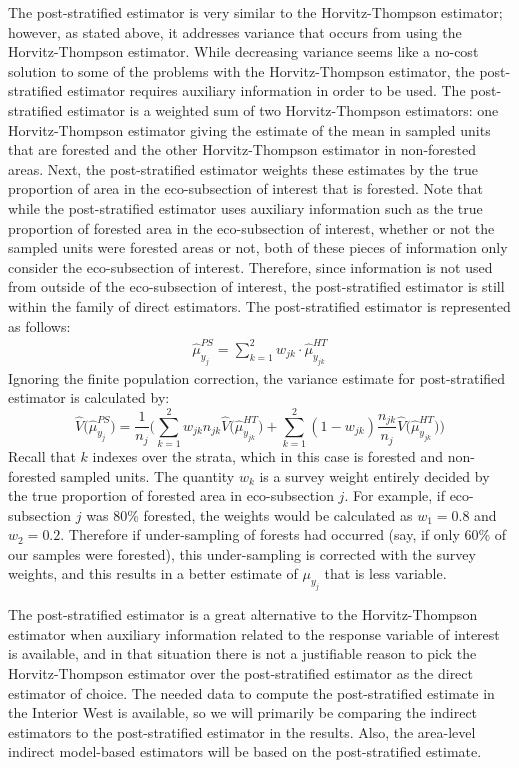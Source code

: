 \documentclass[12pt,twoside]{reedthesis}
\begin{document}
The post-stratified estimator is very similar to the Horvitz-Thompson estimator; however, as stated above, it addresses variance that occurs from using the Horvitz-Thompson estimator. While decreasing variance seems like a no-cost solution to some of the problems with the Horvitz-Thompson estimator, the post-stratified estimator requires auxiliary information in order to be used. The post-stratified estimator is a weighted sum of two Horvitz-Thompson estimators: one Horvitz-Thompson estimator giving the estimate of the mean in sampled units that are forested and the other Horvitz-Thompson estimator in non-forested areas. Next, the post-stratified estimator weights these estimates by the true proportion of area in the eco-subsection of interest that is forested. Note that while the post-stratified estimator uses auxiliary information such as the true proportion of forested area in the eco-subsection of interest, whether or not the sampled units were forested areas or not, both of these pieces of information only consider the eco-subsection of interest. Therefore, since information is not used from outside of the eco-subsection of interest, the post-stratified estimator is still within the family of direct estimators. The post-stratified estimator is represented as follows:
\begin{align}
\hat\mu_{y_j}^{PS} = \sum_{k=1}^{2} w_{jk} \cdot \hat\mu_{y_{jk}}^{HT}
\end{align}
Ignoring the finite population correction, the variance estimate for post-stratified estimator is calculated by:
\[
\hat V\Big(\hat \mu_{y_j}^{PS}\Big) = 
\frac{1}{n_j} \Bigg( \sum_{k=1}^{2} w_{jk} n_{jk} \hat V\Big(\hat\mu_{y_{jk}}^{HT}\Big) + 
\sum_{k=1}^{2} (1 - w_{jk}) \frac{n_{jk}}{n_j} \hat V\Big(\hat\mu_{y_{jk}}^{HT}\Big) \Bigg)
\]
Recall that \(k\) indexes over the strata, which in this case is forested and non-forested sampled units. The quantity \(w_k\) is a survey weight entirely decided by the true proportion of forested area in eco-subsection \(j\). For example, if eco-subsection \(j\) was 80\% forested, the weights would be calculated as \(w_1 = 0.8\) and \(w_2 = 0.2\). Therefore if under-sampling of forests had occurred (say, if only 60\% of our samples were forested), this under-sampling is corrected with the survey weights, and this results in a better estimate of \(\mu_{y_j}\) that is less variable.

The post-stratified estimator is a great alternative to the Horvitz-Thompson estimator when auxiliary information related to the response variable of interest is available, and in that situation there is not a justifiable reason to pick the Horvitz-Thompson estimator over the post-stratified estimator as the direct estimator of choice. The needed data to compute the post-stratified estimate in the Interior West is available, so we will primarily be comparing the indirect estimators to the post-stratified estimator in the results. Also, the area-level indirect model-based estimators will be based on the post-stratified estimate.
\end{document}
